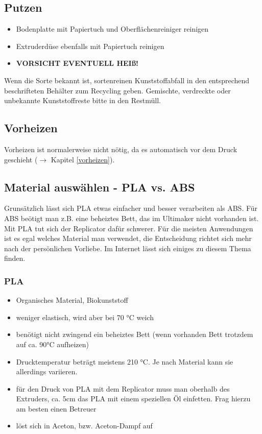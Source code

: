 \documentclass{\basedir/fablab-document}
\begin{document}
\subsection{Putzen} \label{putzen}
\begin{itemize}
 \item Bodenplatte mit Papiertuch und Oberflächenreiniger reinigen
 \item Extruderdüse ebenfalls mit Papiertuch reinigen
 \item \textbf{VORSICHT EVENTUELL HEIß!}
\end{itemize}

Wenn die Sorte bekannt ist, sortenreinen Kunststoffabfall in den entsprechend beschrifteten Behälter zum Recycling geben. Gemischte, verdreckte oder unbekannte Kunststoffreste bitte in den Restmüll.

 

\subsection{Vorheizen}
Vorheizen ist normalerweise nicht nötig, da es automatisch vor dem Druck geschieht ($\to$ Kapitel \ref{vorheizen}).

\subsection{Material auswählen - PLA vs. ABS}
Grunsätzlich lässt sich PLA etwas einfacher und besser verarbeiten als ABS. Für ABS beötigt man z.B. eine beheiztes
Bett, das im Ultimaker nicht vorhanden ist. Mit PLA tut sich der Replicator dafür schwerer. Für die meisten 
Anwendungen ist es egal welches Material man verwendet, die Entscheidung richtet sich mehr nach der persönlichen
Vorliebe. Im Internet lässt sich einiges zu diesem Thema finden.

\subsubsection{PLA}
\begin{itemize}
\item Organisches Material, Biokunststoff
\item weniger elastisch, wird aber bei 70 °C weich
\item benötigt nicht zwingend ein beheiztes Bett (wenn vorhanden Bett trotzdem auf ca. 90°C aufheizen)
\item Drucktemperatur beträgt meistens 210 °C. Je nach Material kann sie allerdings variieren.
\item für den Druck von PLA mit dem Replicator muss man oberhalb des Extruders, ca. 5cm das PLA mit einem speziellen Öl einfetten. Frag hierzu am besten einen Betreuer 
\item löst sich in Aceton, bzw. Aceton-Dampf auf
\end{itemize}
\end{document}
